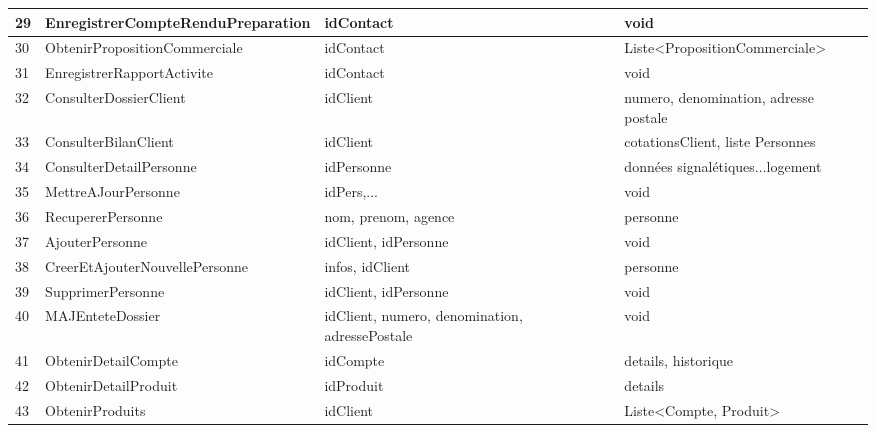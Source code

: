 \begin{table}
{\begin{tabular}{p{1cm}|p{5cm}p{6cm}p{6cm}}
        29 & EnregistrerCompteRenduPreparation  & idContact                                                     & void\\ \hline
        30 & ObtenirPropositionCommerciale      & idContact                                                     & Liste<PropositionCommerciale>\\ \hline
        31 & EnregistrerRapportActivite         & idContact                                                     & void\\ \hline
        32 & ConsulterDossierClient             & idClient                                                      & numero, denomination, adresse postale\\ \hline
        33 & ConsulterBilanClient               & idClient                                                      & cotationsClient, liste Personnes\\ \hline
        34 & ConsulterDetailPersonne            & idPersonne                                                    & données signalétiques...logement\\ \hline
        35 & MettreAJourPersonne                & idPers,...                                                    & void\\ \hline
        36 & RecupererPersonne                  & nom, prenom, agence                                           & personne\\ \hline
        37 & AjouterPersonne                    & idClient, idPersonne                                          & void\\ \hline
        38 & CreerEtAjouterNouvellePersonne     & infos, idClient                                               & personne\\ \hline
        39 & SupprimerPersonne                  & idClient, idPersonne                                          & void\\ \hline
        40 & MAJEnteteDossier                   & idClient, numero, denomination, adressePostale                & void\\ \hline
        41 & ObtenirDetailCompte                & idCompte                                                      & details, historique\\ \hline
        42 & ObtenirDetailProduit               & idProduit                                                     & details\\ \hline
        43 & ObtenirProduits                    & idClient                                                      & Liste<Compte, Produit>\\ \hline

\end{tabular}}
\end{table}
